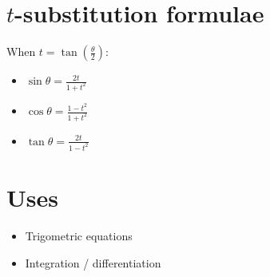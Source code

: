 \section{$t$-substitution formulae}
When $t=\tan\left(\frac{\theta}{2}\right)$:
\begin{itemize}
    \item $\sin\theta = \frac{2t}{1+t^2}$
    \item $\cos\theta = \frac{1-t^2}{1+t^2}$
    \item $\tan\theta = \frac{2t}{1-t^2}$
\end{itemize}

\section{Uses}
\begin{itemize}
    \item Trigometric equations
    \item Integration / differentiation
\end{itemize}
